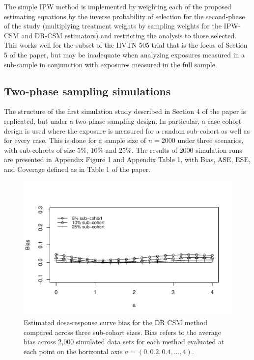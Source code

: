 \documentclass[12pt]{article}
\begin{document}
The simple IPW method is implemented by weighting each of the proposed estimating equations by the inverse probability of selection for the second-phase of the study (multiplying treatment weights by sampling weights for the IPW-CSM and DR-CSM estimators) and restricting the analysis to those selected. This works well for the subset of the HVTN 505 trial that is the focus of Section 5 of the paper, but may be inadequate when analyzing exposures measured in a sub-sample in conjunction with exposures measured in the full sample.

\subsection{Two-phase sampling simulations}

The structure of the first simulation study described in Section 4 of the paper is replicated, but under a two-phase sampling design. In particular, a case-cohort design is used where the exposure is measured for a random sub-cohort as well as for every case. This is done for a sample size of $n=2000$ under three scenarios, with sub-cohorts of size $5\%$, $10\%$ and $25\%$. The results of 2000 simulation runs are presented in Appendix Figure 1 and Appendix Table 1, with Bias, ASE, ESE, and Coverage defined as in Table 1 of the paper.

\begin{figure}
\centering
\includegraphics[width=6in]{app_fig1.pdf}
\caption{Estimated dose-response curve bias for the DR CSM method compared across three sub-cohort sizes. Bias refers to the average bias across 2,000 simulated data sets for each method evaluated at each point on the horizontal axis $a = (0, 0.2, 0.4, ..., 4)$.}
\end{figure}
\end{document}
